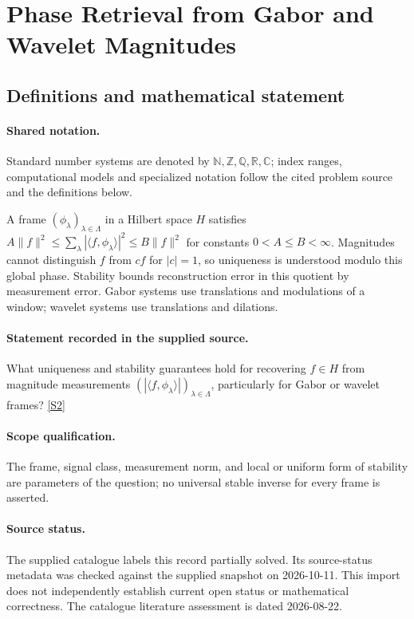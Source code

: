 \documentclass[11pt]{article}
\newcommand{\sref}[2]{\hyperlink{source:#1:#2}{[S#2]}}
\begin{document}
\section{Phase Retrieval from Gabor and Wavelet Magnitudes}\label{statement}

\subsection{Definitions and mathematical statement}

\paragraph{Shared notation.}Standard number systems are denoted by $\mathbb N,\mathbb Z,\mathbb Q,\mathbb R,\mathbb C$; index ranges, computational models and specialized notation follow the cited problem source and the definitions below.


A frame $(\phi_\lambda)_{\lambda\in\Lambda}$ in a Hilbert space $H$ satisfies $A\|f\|^2\leq\sum_\lambda|\langle f,\phi_\lambda\rangle|^2\leq B\|f\|^2$ for constants $0<A\leq B<\infty$. Magnitudes cannot distinguish $f$ from $cf$ for $|c|=1$, so uniqueness is understood modulo this global phase. Stability bounds reconstruction error in this quotient by measurement error. Gabor systems use translations and modulations of a window; wavelet systems use translations and dilations.
\paragraph{Statement recorded in the supplied source.}
What uniqueness and stability guarantees hold for recovering $f\in H$ from magnitude measurements $(|\langle f,\phi_\lambda\rangle|)_{\lambda\in\Lambda}$, particularly for Gabor or wavelet frames? \sref{statement}{2}
\paragraph{Scope qualification.}
The frame, signal class, measurement norm, and local or uniform form of stability are parameters of the question; no universal stable inverse for every frame is asserted.
\paragraph{Source status.}
The supplied catalogue labels this record partially solved. Its source-status metadata was checked against the supplied snapshot on 2026-10-11. This import does not independently establish current open status or mathematical correctness. The catalogue literature assessment is dated 2026-08-22.
\end{document}
